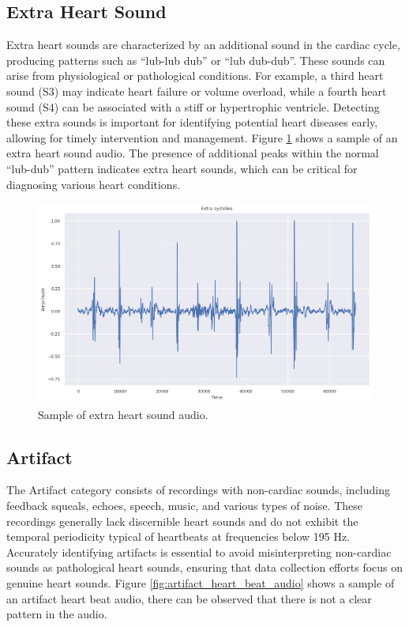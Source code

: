 \subsection{Extra Heart Sound}
Extra heart sounds are characterized by an additional sound in the cardiac cycle, producing patterns such as ``lub-lub dub'' or ``lub dub-dub''.
These sounds can arise from physiological or pathological conditions. For example, a third heart sound (S3) may indicate heart failure or volume overload,
while a fourth heart sound (S4) can be associated with a stiff or hypertrophic ventricle.
Detecting these extra sounds is important for identifying potential heart diseases early, allowing for timely intervention and management.
Figure \ref{fig:extrahls_heart_beat_audio} shows a sample of an extra heart sound audio.
The presence of additional peaks within the normal ``lub-dub'' pattern indicates extra heart sounds, which can be
critical for diagnosing various heart conditions.

\begin{figure}[H]
    \centering
    \includegraphics[width=.8\columnwidth]{../images/extrastoles_heart_beat_audio.png}
    \caption{Sample of extra heart sound audio.}
    \label{fig:extrahls_heart_beat_audio}
\end{figure}
\noindent

\subsection{Artifact}
The Artifact category consists of recordings with non-cardiac sounds, including feedback squeals, echoes, speech, music, and various types of noise.
These recordings generally lack discernible heart sounds and do not exhibit the temporal periodicity typical of heartbeats at frequencies below 195 Hz.
Accurately identifying artifacts is essential to avoid misinterpreting non-cardiac sounds as pathological heart sounds,
ensuring that data collection efforts focus on genuine heart sounds.
Figure \ref{fig:artifact_heart_beat_audio} shows a sample of an artifact heart beat audio, there can be observed that there is not a clear pattern in the audio.

